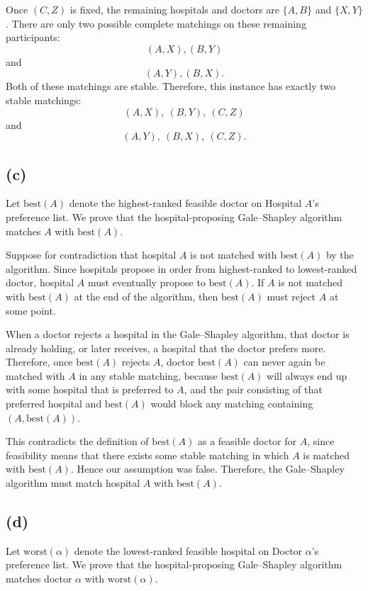 \documentclass{brockcosc3p03}
\begin{document}
Once $(C,Z)$ is fixed, the remaining hospitals and doctors are $\{A,B\}$ and $\{X,Y\}$. There are only two possible complete matchings on these remaining participants:
\[
(A,X),(B,Y)
\]
and
\[
(A,Y),(B,X).
\]
Both of these matchings are stable. Therefore, this instance has exactly two stable matchings:
\[
(A,X),\ (B,Y),\ (C,Z)
\]
and
\[
(A,Y),\ (B,X),\ (C,Z).
\]

\subsection*{(c)}

Let $\mathrm{best}(A)$ denote the highest-ranked feasible doctor on Hospital $A$'s preference list. We prove that the hospital-proposing Gale--Shapley algorithm matches $A$ with $\mathrm{best}(A)$.

Suppose for contradiction that hospital $A$ is not matched with $\mathrm{best}(A)$ by the algorithm. Since hospitals propose in order from highest-ranked to lowest-ranked doctor, hospital $A$ must eventually propose to $\mathrm{best}(A)$. If $A$ is not matched with $\mathrm{best}(A)$ at the end of the algorithm, then $\mathrm{best}(A)$ must reject $A$ at some point.

When a doctor rejects a hospital in the Gale--Shapley algorithm, that doctor is already holding, or later receives, a hospital that the doctor prefers more. Therefore, once $\mathrm{best}(A)$ rejects $A$, doctor $\mathrm{best}(A)$ can never again be matched with $A$ in any stable matching, because $\mathrm{best}(A)$ will always end up with some hospital that is preferred to $A$, and the pair consisting of that preferred hospital and $\mathrm{best}(A)$ would block any matching containing $(A,\mathrm{best}(A))$.

This contradicts the definition of $\mathrm{best}(A)$ as a feasible doctor for $A$, since feasibility means that there exists some stable matching in which $A$ is matched with $\mathrm{best}(A)$. Hence our assumption was false. Therefore, the Gale--Shapley algorithm must match hospital $A$ with $\mathrm{best}(A)$.

\subsection*{(d)}

Let $\mathrm{worst}(\alpha)$ denote the lowest-ranked feasible hospital on Doctor $\alpha$'s preference list. We prove that the hospital-proposing Gale--Shapley algorithm matches doctor $\alpha$ with $\mathrm{worst}(\alpha)$.
\end{document}

